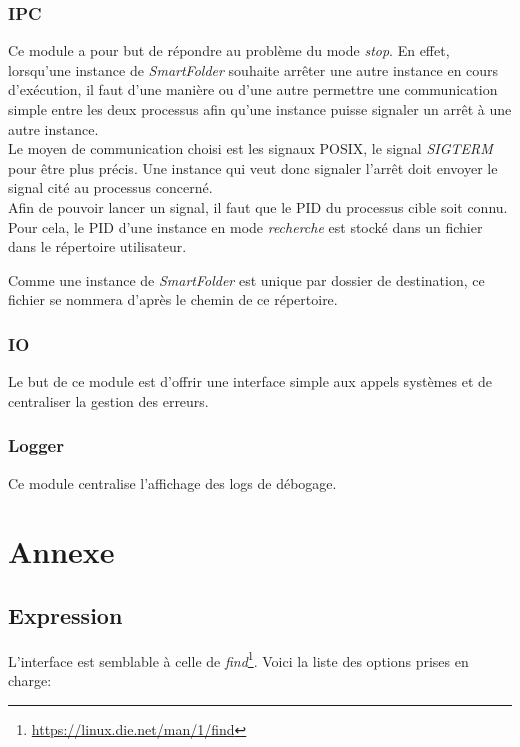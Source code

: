 \documentclass[11pt, a4paper]{article}
\begin{document}
\subsubsection{IPC}
\label{sec:ipc}
Ce module a pour but de répondre au problème du mode \textit{stop}.
En effet, lorsqu'une instance de \textit{SmartFolder} souhaite arrêter une autre instance en cours d'exécution,
il faut d'une manière ou d'une autre permettre une communication simple entre les deux processus afin
qu'une instance puisse signaler un arrêt à une autre instance. \\

Le moyen de communication choisi est les signaux POSIX, le signal \textit{SIGTERM} pour être plus précis.
Une instance qui veut donc signaler l'arrêt doit envoyer le signal cité au processus concerné. \\

Afin de pouvoir lancer un signal, il faut que le PID du processus cible soit connu.
Pour cela, le PID d'une instance en mode \textit{recherche} est stocké dans un fichier
dans le répertoire utilisateur.

Comme une instance de \textit{SmartFolder} est unique par dossier de destination,
ce fichier se nommera d'après le chemin de ce répertoire.

\subsubsection{IO}
Le but de ce module est d'offrir une interface simple aux appels systèmes et de centraliser la gestion des erreurs.

\subsubsection{Logger}
Ce module centralise l'affichage des logs de débogage.

\newpage

\section{Annexe}
\subsection{Expression}
\label{ann_exp}
L'interface est semblable à celle de \textit{find}\footnote{\url{https://linux.die.net/man/1/find}}.
Voici la liste des options prises en charge:\\
\end{document}
